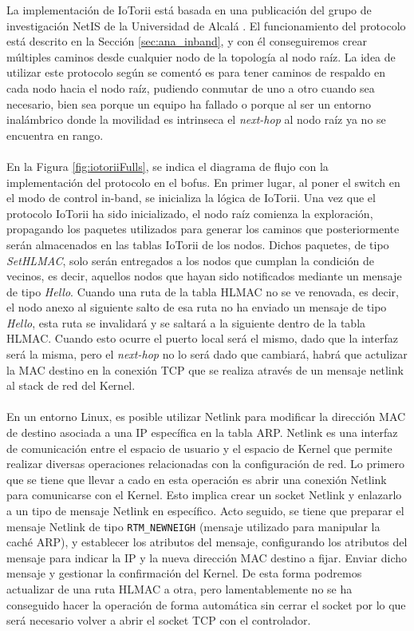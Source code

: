 La implementación de IoTorii está basada en una publicación del grupo de investigación NetIS de la Universidad de Alcalá \cite{rojas2021outperforming}. El funcionamiento del protocolo está descrito en la Sección \ref{sec:ana_inband}, y con él conseguiremos crear múltiples caminos desde cualquier nodo de la topología al nodo raíz. La idea de utilizar este protocolo según se comentó es para tener caminos de respaldo en cada nodo hacia el nodo raíz, pudiendo conmutar de uno a otro cuando sea necesario, bien sea porque un equipo ha fallado o porque al ser un entorno inalámbrico donde la movilidad es intrinseca el \textit{next-hop} al nodo raíz ya no se encuentra en rango.\\
\\
En la Figura \ref{fig:iotoriiFulls}, se indica el diagrama de flujo con la implementación del protocolo en el \gls{bofus}. En primer lugar, al poner el switch en el modo de control in-band, se inicializa la lógica de IoTorii. Una vez que el protocolo IoTorii ha sido inicializado, el nodo raíz comienza la exploración, propagando los paquetes utilizados para generar los caminos que posteriormente serán almacenados en las tablas IoTorii de los nodos. Dichos paquetes, de tipo \textit{SetHLMAC}, solo serán entregados a los nodos que cumplan la condición de vecinos, es decir, aquellos nodos que hayan sido notificados mediante un mensaje de tipo \textit{Hello}. Cuando una ruta de la tabla HLMAC no se ve renovada, es decir, el nodo anexo al siguiente salto de esa ruta no ha enviado un mensaje de tipo \textit{Hello}, esta ruta se invalidará y se saltará a la siguiente dentro de la tabla HLMAC. Cuando esto ocurre el puerto local será el mismo, dado que la interfaz será la misma, pero el \textit{next-hop} no lo será dado que cambiará, habrá que actulizar la MAC destino en la conexión TCP que se realiza através de un mensaje netlink al stack de red del Kernel. \\
\\
En un entorno Linux, es posible utilizar Netlink para modificar la dirección MAC de destino asociada a una IP específica en la tabla ARP. Netlink es una interfaz de comunicación entre el espacio de usuario y el espacio de Kernel que permite realizar diversas operaciones relacionadas con la configuración de red. Lo primero que se tiene que llevar a cado en esta operación es abrir una conexión Netlink para comunicarse con el Kernel. Esto implica crear un socket Netlink y enlazarlo a un tipo de mensaje Netlink en específico. Acto seguido, se tiene que preparar el mensaje Netlink de tipo \texttt{RTM\_NEWNEIGH} (mensaje utilizado para manipular la caché ARP), y establecer los atributos del mensaje, configurando los atributos del mensaje para indicar la IP y la nueva dirección MAC destino a fijar. Enviar dicho mensaje y gestionar la confirmación del Kernel. De esta forma podremos actualizar de una ruta HLMAC a otra, pero lamentablemente no se ha conseguido hacer la operación de forma automática sin cerrar el socket por lo que será necesario volver a abrir el socket TCP con el controlador.\\
\\



